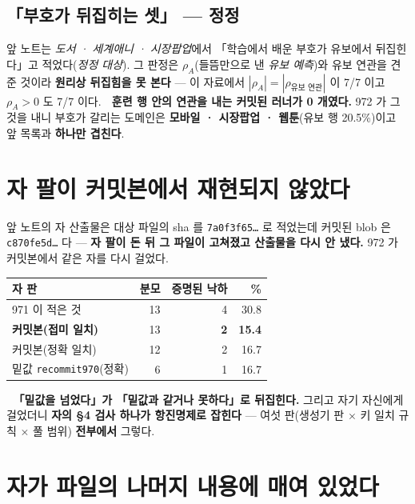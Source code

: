 \documentclass[10pt]{article}
\begin{document}
\subsection{「부호가 뒤집히는 셋」 --- 정정}

앞 노트는 \emph{도서 · 세계애니 · 시장팝업}에서 「학습에서 배운 부호가 유보에서 뒤집힌다」고
적었다(\emph{정정 대상}). 그 판정은 $\rho_A$(들뜸만으로 낸 \emph{유보 예측})와 유보 연관을 견준 것이라
\textbf{원리상 뒤집힘을 못 본다} --- 이 자료에서 $|\rho_A| = |\rho_{\text{유보 연관}}|$ 이 7/7 이고
$\rho_A > 0$ 도 7/7 이다. 🔴 \textbf{훈련 행 안의 연관을 내는 커밋된 러너가 0 개였다.}
972 가 그것을 내니 부호가 갈리는 도메인은 \textbf{모바일 · 시장팝업 · 웹툰}(유보 행 20.5\%)이고
앞 목록과 \textbf{하나만 겹친다}.


\section{자 팔이 커밋본에서 재현되지 않았다}

앞 노트의 자 산출물은 대상 파일의 sha 를 \texttt{7a0f3f65\ldots} 로 적었는데
커밋된 blob 은 \texttt{c870fe5d\ldots} 다 --- \textbf{자 팔이 돈 뒤 그 파일이 고쳐졌고
산출물을 다시 안 냈다.} 972 가 커밋본에서 같은 자를 다시 걸었다.

\begin{center}\tsize
\begin{tabular}{lrrr}
\toprule
자 판 & 분모 & 증명된 낙하 & \% \\
\midrule
971 이 적은 것 & 13 & 4 & 30.8 \\
\textbf{커밋본(접미 일치)} & 13 & \textbf{2} & \textbf{15.4} \\
커밋본(정확 일치) & 12 & 2 & 16.7 \\
밑값 \texttt{recommit970}(정확) & 6 & 1 & 16.7 \\
\bottomrule
\end{tabular}
\end{center}

🔴 \textbf{「밑값을 넘었다」가 「밑값과 같거나 못하다」로 뒤집힌다.}
그리고 자기 자신에게 걸었더니 \textbf{자의 §4 검사 하나가 항진명제로 잡힌다} ---
여섯 판(생성기 판 $\times$ 키 일치 규칙 $\times$ 풀 범위) \textbf{전부에서} 그렇다.

\section{자가 파일의 나머지 내용에 매여 있었다}
\end{document}
